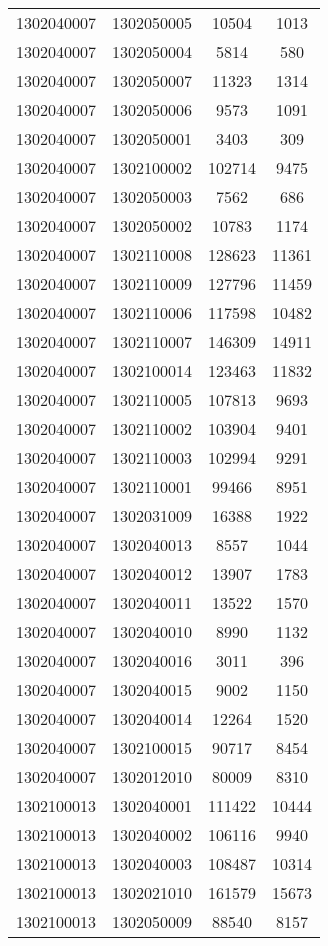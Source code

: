 \begin{longtable}{llcc}
1302040007 & 1302050005 & 10504 & 1013\\
1302040007 & 1302050004 & 5814 & 580\\
1302040007 & 1302050007 & 11323 & 1314\\
1302040007 & 1302050006 & 9573 & 1091\\
1302040007 & 1302050001 & 3403 & 309\\
1302040007 & 1302100002 & 102714 & 9475\\
1302040007 & 1302050003 & 7562 & 686\\
1302040007 & 1302050002 & 10783 & 1174\\
1302040007 & 1302110008 & 128623 & 11361\\
1302040007 & 1302110009 & 127796 & 11459\\
1302040007 & 1302110006 & 117598 & 10482\\
1302040007 & 1302110007 & 146309 & 14911\\
1302040007 & 1302100014 & 123463 & 11832\\
1302040007 & 1302110005 & 107813 & 9693\\
1302040007 & 1302110002 & 103904 & 9401\\
1302040007 & 1302110003 & 102994 & 9291\\
1302040007 & 1302110001 & 99466 & 8951\\
1302040007 & 1302031009 & 16388 & 1922\\
1302040007 & 1302040013 & 8557 & 1044\\
1302040007 & 1302040012 & 13907 & 1783\\
1302040007 & 1302040011 & 13522 & 1570\\
1302040007 & 1302040010 & 8990 & 1132\\
1302040007 & 1302040016 & 3011 & 396\\
1302040007 & 1302040015 & 9002 & 1150\\
1302040007 & 1302040014 & 12264 & 1520\\
1302040007 & 1302100015 & 90717 & 8454\\
1302040007 & 1302012010 & 80009 & 8310\\
1302100013 & 1302040001 & 111422 & 10444\\
1302100013 & 1302040002 & 106116 & 9940\\
1302100013 & 1302040003 & 108487 & 10314\\
1302100013 & 1302021010 & 161579 & 15673\\
1302100013 & 1302050009 & 88540 & 8157\\

\end{longtable}
